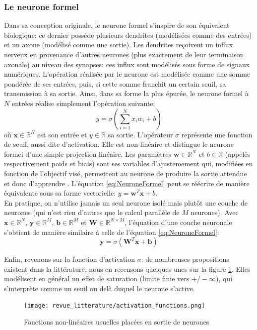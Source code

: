 \subsubsection{Le neurone formel}
Dans sa conception originale, le neurone formel s'inspire de son équivalent biologique: ce dernier possède plusieurs dendrites (modélisées comme des entrées) et un axone (modélisé comme une sortie). Les dendrites reçoivent un influx nerveux en provenance d'autres neurones (plus exactement de leur terminaison axonale) au niveau des synapses: ces influx sont modélisés sous forme de signaux numériques. L'opération réalisée par le neurone est modélisée comme une somme pondérée de ses entrées, puis, si cette somme franchit un certain seuil, sa transmission à sa sortie. Ainsi, dans sa forme la plus épurée, le neurone formel à $N$ entrées réalise simplement l'opération suivante:
\begin{equation}
	\label{eq:NeuroneFormel}
	y = \sigma(\sum_{i = 1}^N x_i w_i + b)
\end{equation}
où $\mathbf{x} \in \mathbb{R}^N$ est son entrée et $y \in \mathbb{R}$ sa sortie.
L'opérateur $\sigma$ représente une fonction de seuil, aussi dite d'activation. Elle est non-linéaire et distingue le neurone formel d'une simple projection linéaire. Les paramètres $\mathbf{w} \in \mathbb{R}^N$ et $b \in \mathbb{R}$ (appelés respectivement poids et biais) sont ses variables d'ajustemement qui, modifiées en fonction de l'objectif visé, permettent au neurone de produire la sortie attendue et donc \og d'apprendre \fg. L'équation \ref{eq:NeuroneFormel} peut se réécrire de manière équivalente sous sa forme vectorielle: $y = \mathbf{w}^T\mathbf{x} + b$. \\
En pratique, on n'utilise jamais un seul neurone isolé mais plutôt une couche de neurones (qui n'est rien d'autres que le calcul parallèle de $M$ neurones). Avec $\mathbf{x} \in \mathbb{R}^N$, $\mathbf{y} \in \mathbb{R}^M$, $\mathbf{b} \in \mathbb{R}^M$ et $\mathbf{W} \in \mathbb{R}^{N\times M}$, l'équation d'une couche neuronale s'obtient de manière similaire à celle de l'équation \ref{eq:NeuroneFormel}:
\begin{equation}
	\label{eq:CoucheNeuroneFormel}
	\mathbf{y} = \sigma(\mathbf{W}^T\mathbf{x} + \mathbf{b})
\end{equation}

Enfin, revenons sur la fonction d'activation $\sigma$: de nombreuses propositions existent dans la littérature, nous en recensons quelques unes sur la figure \ref{fig:activations_functions}. Elles modélisent en général un effet de saturation (limite finie vers $+/- \infty$), qui s'interprète comme un seuil au delà duquel le neurone s'active.
\begin{figure}[htb]
	\centering
	\texttt{[image: revue\_litterature/activation\_functions.png]}
	\caption{Fonctions non-linéaires usuelles placées en sortie de neurones}
	\label{fig:activations_functions}
\end{figure}

